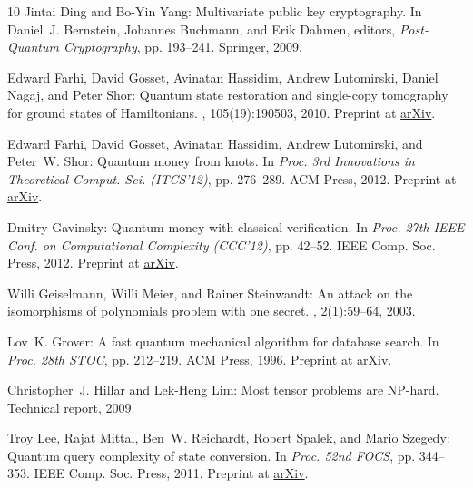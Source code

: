 \begin{thebibliography}{10}
{\sc Jintai Ding and Bo-Yin Yang}: Multivariate public key cryptography.
\newblock In {\sc Daniel~J. Bernstein, Johannes Buchmann, and Erik Dahmen},
  editors, {\em Post-Quantum Cryptography}, pp. 193--241. Springer, 2009.
\newblock [\epfmtdoi{10.1007/978-3-540-88702-7\_6}]

{\sc Edward Farhi, David Gosset, Avinatan Hassidim, Andrew Lutomirski, Daniel
  Nagaj, and Peter Shor}: Quantum state restoration and single-copy tomography
  for ground states of {H}amiltonians.
, 105(19):190503, 2010.
\newblock Preprint at \href{http://arxiv.org/abs/0912.3823}{arXiv}.

{\sc Edward Farhi, David Gosset, Avinatan Hassidim, Andrew Lutomirski, and
  Peter~W. Shor}: Quantum money from knots.
\newblock In {\em Proc. 3rd Innovations in Theoretical Comput. Sci. (ITCS'12)},
  pp. 276--289. ACM Press, 2012.
\newblock Preprint at \href{http://arxiv.org/abs/1004.5127}{arXiv}.
\newblock [\epfmtdoi{10.1145/2090236.2090260}]

{\sc Dmitry Gavinsky}: Quantum money with classical verification.
\newblock In {\em Proc. 27th IEEE Conf. on Computational Complexity (CCC'12)},
  pp. 42--52. IEEE Comp. Soc. Press, 2012.
\newblock Preprint at \href{http://arxiv.org/abs/1109.0372}{arXiv}.

{\sc Willi Geiselmann, Willi Meier, and Rainer Steinwandt}: An attack on the
  isomorphisms of polynomials problem with one secret.
, 2(1):59--64, 2003.
\newblock [\epfmtdoi{10.1007/s10207-003-0025-5}]

{\sc Lov~K. Grover}: A fast quantum mechanical algorithm for database search.
\newblock In {\em Proc. 28th STOC}, pp. 212--219. ACM Press, 1996.
\newblock Preprint at \href{http://arxiv.org/abs/quant-ph/9605043}{arXiv}.
\newblock [\epfmtdoi{10.1145/237814.237866}]

{\sc Christopher~J. Hillar and Lek-Heng Lim}: Most tensor problems are
  {NP}-hard.
\newblock Technical report, 2009.

{\sc Troy Lee, Rajat Mittal, Ben~W. Reichardt, Robert Spalek, and Mario
  Szegedy}: Quantum query complexity of state conversion.
\newblock In {\em Proc. 52nd FOCS}, pp. 344--353. IEEE Comp. Soc. Press, 2011.
\newblock Preprint at \href{http://arxiv.org/abs/1011.3020}{arXiv}.


\end{thebibliography}
